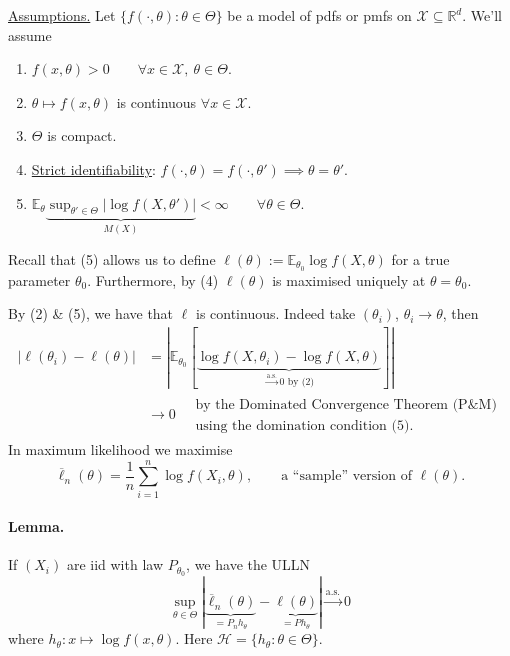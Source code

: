\documentclass[11pt,a4paper]{article}
\begin{document}
\medskip\noindent\underline{Assumptions.}
Let $\{f(\cdot,\theta):\theta\in\Theta\}$ be a model of pdfs or pmfs on
$\mathcal{X}\subseteq\mathbb{R}^d$. We'll assume
\begin{enumerate}
\item[(1)] $f(x,\theta)>0\qquad\forall x\in\mathcal{X},\ \theta\in\Theta$.
\item[(2)] $\theta\mapsto f(x,\theta)$ is continuous $\forall x\in\mathcal{X}$.
\item[(3)] $\Theta$ is compact.
\item[(4)] \underline{Strict identifiability}: $f(\cdot,\theta)=f(\cdot,\theta')
\implies\theta=\theta'$.
\item[(5)] $\displaystyle\mathbb{E}_\theta
\underbrace{\sup_{\theta'\in\Theta}|\log f(X,\theta')|}_{M(X)}<\infty
\qquad\forall\theta\in\Theta$.
\end{enumerate}

Recall that (5) allows us to define
$\ell(\theta):=\mathbb{E}_{\theta_0}\log f(X,\theta)$ for a true parameter $\theta_0$.
Furthermore, by (4) $\ell(\theta)$ is maximised uniquely at $\theta=\theta_0$.

By (2) \& (5), we have that $\ell$ is continuous.
Indeed take $(\theta_i)$, $\theta_i\to\theta$, then
\[
\begin{aligned}
|\ell(\theta_i)-\ell(\theta)|
&=\left|\mathbb{E}_{\theta_0}\left[
\underbrace{\log f(X,\theta_i)-\log f(X,\theta)}
_{\xrightarrow{\mathrm{a.s.}}0\text{ by (2)}}\right]\right|\\
&\longrightarrow0\quad\begin{gathered}
\text{by the Dominated Convergence Theorem (P\&M)}\\
\text{using the domination condition (5).}
\end{gathered}
\end{aligned}
\]
In maximum likelihood we maximise
\[
\overline{\ell}_n(\theta)=\frac{1}{n}\sum_{i=1}^n\log f(X_i,\theta),
\qquad\text{a ``sample'' version of }\ell(\theta).
\]

\paragraph{Lemma.}
If $(X_i)$ are iid with law $P_{\theta_0}$, we have the ULLN
\[
\sup_{\theta\in\Theta}\left|
\underbrace{\overline{\ell}_n(\theta)}_{=P_nh_\theta}
-\underbrace{\ell(\theta)}_{=Ph_\theta}\right|
\xrightarrow{\mathrm{a.s.}}0
\]
where $h_\theta:x\mapsto\log f(x,\theta)$.
Here $\mathcal{H}=\{h_\theta:\theta\in\Theta\}$.
\end{document}
